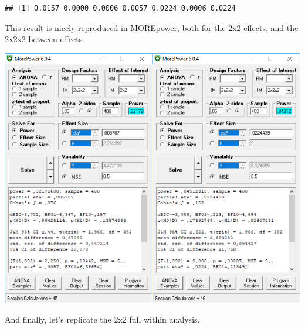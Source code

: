 \documentclass[]{book}
\newenvironment{Shaded}{\begin{snugshade}}{\end{snugshade}}
\newcommand{\NormalTok}[1]{#1}
\newcommand{\OperatorTok}[1]{\textcolor[rgb]{0.81,0.36,0.00}{\textbf{#1}}}
\begin{document}
\begin{Shaded}
\end{Shaded}

\begin{verbatim}
## [1] 0.0157 0.0000 0.0006 0.0057 0.0224 0.0006 0.0224
\end{verbatim}

This result is nicely reproduced in MOREpower, both for the 2x2 effects, and the 2x2x2 between effects.

\includegraphics{screenshots/morepower_5.png}

And finally, let's replicate the 2x2 full within analysis.
\end{document}
